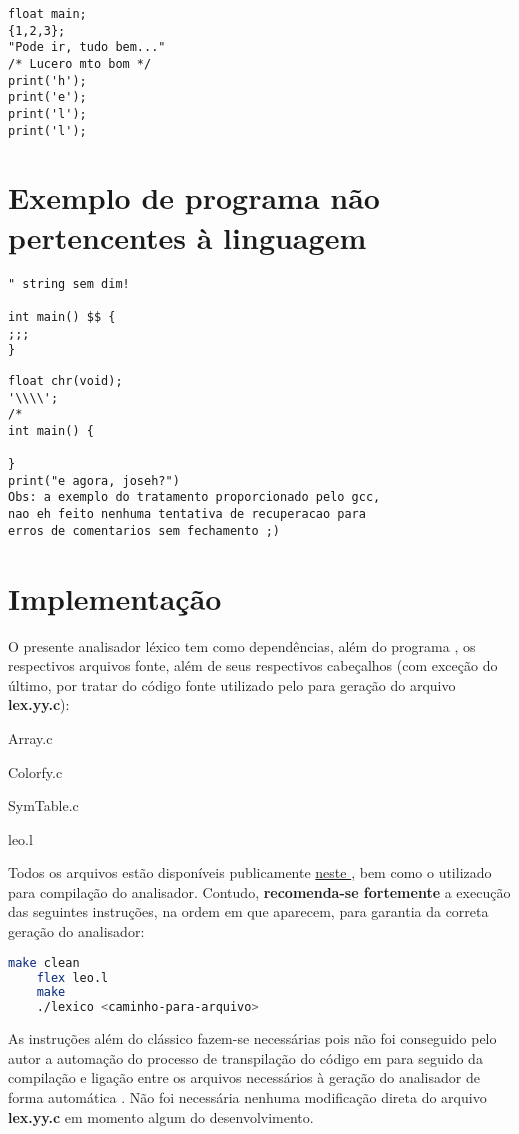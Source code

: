 \documentclass[
	article,			%
	11pt,				%
	oneside,			%
	a4paper,			%
	english,			%
	brazil,				%
	sumario=tradicional
	]{abntex2}
\begin{document}
\begin{lstlisting}[style=CStyle]
float main;
{1,2,3};
"Pode ir, tudo bem..."
/* Lucero mto bom */
print('h');
print('e');
print('l');
print('l');
\end{lstlisting}

\section{Exemplo de programa não pertencentes à linguagem}

\begin{lstlisting}[style=CStyle]
" string sem dim!

int main() $$ {
;;;
}
\end{lstlisting}

\begin{lstlisting}[style=CStyle]
float chr(void);
'\\\\';
/*
int main() {

}
print("e agora, joseh?")
Obs: a exemplo do tratamento proporcionado pelo gcc,
nao eh feito nenhuma tentativa de recuperacao para
erros de comentarios sem fechamento ;)
\end{lstlisting}



\section{Implementação}
O presente analisador léxico tem como dependências, além do programa , os respectivos arquivos fonte, além de seus respectivos cabeçalhos (com exceção do último, por tratar do código fonte utilizado pelo  para geração do arquivo \textbf{lex.yy.c}):
	\begin{itemize}{
		\item{Array.c}
		\item{Colorfy.c}
		\item{SymTable.c}
		\item{leo.l}
	}\end{itemize}
Todos os arquivos estão disponíveis publicamente \href{https://github.com/maffei2443/unb_tradutores/tree/master/trab/trab2/code/src}{neste }, bem como o  utilizado para compilação do analisador. Contudo, \textbf{recomenda-se fortemente} a execução das seguintes instruções, na ordem em que aparecem, para garantia da correta geração do analisador:

\begin{lstlisting}[language=bash,caption={bash version}]
	make clean
	flex leo.l
	make
	./lexico <caminho-para-arquivo>
\end{lstlisting}
As instruções além do clássico  fazem-se necessárias pois não foi conseguido pelo autor a automação do processo de transpilação do código em  para  seguido da compilação e ligação entre os arquivos necessários à geração do analisador de forma automática . Não foi necessária nenhuma modificação direta do arquivo \textbf{lex.yy.c} em momento algum do desenvolvimento.
\end{document}
